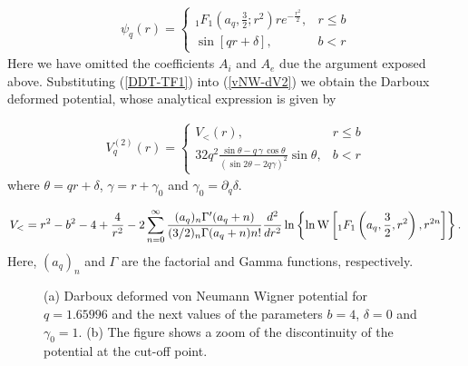 \documentclass[a4paper]{jpconf}
\begin{document}
\begin{eqnarray}
\psi_q(r)=\left\{
\begin{array}{cc}
  _1F_1\left(a_{q},\frac{3}{2};r^{2}\right)re^{-\frac{r^{2}}{2}} , & r\leq b  \\[0.2cm]
\sin{[qr+\delta]},&b<r   \label{DDT-TF1}
\end{array}
\right.
\end{eqnarray}
Here we have omitted the coefficients $A_i$ and $A_e$ due the argument exposed above. Substituting (\ref{DDT-TF1}) into (\ref{vNW-dV2}) we obtain the Darboux deformed potential, whose analytical expression is given by

\begin{eqnarray}
V^{(2)}_{q}(r)=\left\{
\begin{array}{cc}
 V_{<}(r), & r\leq b  \\[0.2cm]
32 q^2\frac{\sin{\theta}-q\,\gamma\,\cos{\theta}}{(\sin{2\theta}-2q\gamma)^2}\sin{\theta},&b<r   \label{DDT-V2}
\end{array}
\right.\end{eqnarray}
where $\theta=qr+\delta$, $\gamma=r+\gamma_0$ and $\gamma_0=\partial_q \delta$.

\begin{equation}
V_{<}=r^{2}-b^{2}-4+\frac{4}{r^2}-2\sum_{n=0}^{\infty}\frac{(a_{q})_{n}\Gamma'(a_{q}+n)}{(3/2)_{n}\Gamma(a_{q}+n)n!}\frac{d^{2}}{dr^{2}}\ln\left\{ \ln {\rm W} \left[  _1F_1\left(a_{q},\frac{3}{2},r^{2}\right),r^{2n}\right]\right\}.\label{DDT-V<}
\end{equation}
Here, $(a_q)_n$ and $\Gamma$ are the factorial and Gamma functions, respectively.  
\begin{figure}
\centering
{}%
\hfill%
%
\caption{{\label{Figure vNWPot}} (a) Darboux deformed von Neumann Wigner potential for $q=1.65996$ and the next values of the parameters  $b=4$, $\delta=0$ and $\gamma_0=1$. (b) The figure shows a zoom of the discontinuity of the potential at the cut-off point.}
\end{figure}
\end{document}
